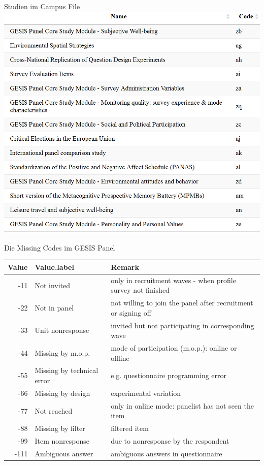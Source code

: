 \documentclass[ignorenonframetext,]{beamer}
\begin{document}
\begin{frame}{Studien im Campus File}
\includegraphics{figure/GPstudies_CampusFile.PNG}

\end{frame}

\begin{frame}{Die Missing Codes im GESIS Panel}

\begin{table}[H]
\centering\begingroup\fontsize{7}{9}\selectfont

\begin{tabular}{r|l|l}
\hline
Value & Value.label & Remark\\
\hline
-11 & Not invited & only in recruitment waves - when profile survey not finished\\
\hline
-22 & Not in panel & not willing to join the panel after recruitment or signing off\\
\hline
-33 & Unit nonresponse & invited but not participating in corresponding wave\\
\hline
-44 & Missing by m.o.p. & mode of participation (m.o.p.): online or offline\\
\hline
-55 & Missing by technical error & e.g. questionnaire programming error\\
\hline
-66 & Missing by design & experimental variation\\
\hline
-77 & Not reached & only in online mode: panelist has not seen the item\\
\hline
-88 & Missing by filter & filtered item\\
\hline
-99 & Item nonresponse & due to nonresponse by the respondent\\
\hline
-111 & Ambiguous answer & ambiguous answers in questionnaire\\
\hline
\end{tabular}
\endgroup{}
\end{table}

\end{frame}
\end{document}
